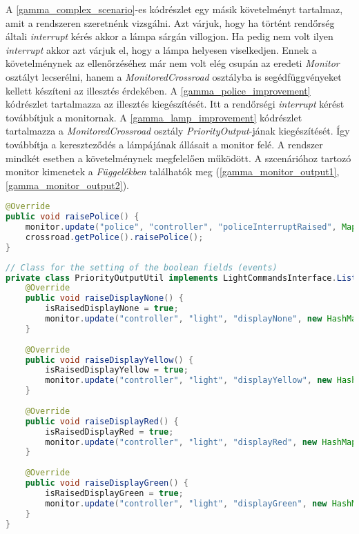 A \ref{gamma_complex_scenario}-es kódrészlet egy másik követelményt tartalmaz, amit a rendszeren szeretnénk vizsgálni.
Azt várjuk, hogy ha történt rendőrség általi \textit{interrupt} kérés akkor a lámpa sárgán villogjon.
Ha pedig nem volt ilyen \textit{interrupt} akkor azt várjuk el, hogy a lámpa helyesen viselkedjen.
Ennek a követelménynek az ellenőrzéséhez már nem volt elég csupán az eredeti \textit{Monitor} osztályt lecserélni, hanem a \textit{MonitoredCrossroad} osztályba is segédfüggvényeket kellett készíteni az illesztés érdekében.
A \ref{gamma_police_improvement} kódrészlet tartalmazza az illesztés kiegészítését.
Itt a rendőrségi \textit{interrupt} kérést továbbítjuk a monitornak.
A \ref{gamma_lamp_improvement} kódrészlet tartalmazza a \textit{MonitoredCrossroad} osztály \textit{PriorityOutput}-jának kiegészítését.
Így továbbítja a kereszteződés a lámpájának állásait a monitor felé.
A rendszer mindkét esetben a követelménynek megfelelően működött.
A szcenárióhoz tartozó monitor kimenetek a \textit{Függelékben} találhatók meg (\ref{gamma_monitor_output1}, \ref{gamma_monitor_output2}).

\begin{lstlisting}[language=java, frame=single, float=ht!, caption={\textit{Gamma} illesztéshez tartozó kódrészlet.},captionpos=b,label=gamma_police_improvement]
@Override
public void raisePolice() {
    monitor.update("police", "controller", "policeInterruptRaised", Map.of("success", true));
    crossroad.getPolice().raisePolice();
}
\end{lstlisting}

\begin{lstlisting}[language=java, frame=single, float=ht!, caption={\textit{MonitoredCrossroad} osztály kiegészítése a monitor illesztésével.},captionpos=b,label=gamma_lamp_improvement]
// Class for the setting of the boolean fields (events)
private class PriorityOutputUtil implements LightCommandsInterface.Listener.Provided {
    @Override
    public void raiseDisplayNone() {
        isRaisedDisplayNone = true;
        monitor.update("controller", "light", "displayNone", new HashMap<String, Object>());
    }
    
    @Override
    public void raiseDisplayYellow() {
        isRaisedDisplayYellow = true;
        monitor.update("controller", "light", "displayYellow", new HashMap<String, Object>());
    }
    
    @Override
    public void raiseDisplayRed() {
        isRaisedDisplayRed = true;
        monitor.update("controller", "light", "displayRed", new HashMap<String, Object>());
    }
    
    @Override
    public void raiseDisplayGreen() {
        isRaisedDisplayGreen = true;
        monitor.update("controller", "light", "displayGreen", new HashMap<String, Object>());
    }
}
\end{lstlisting}